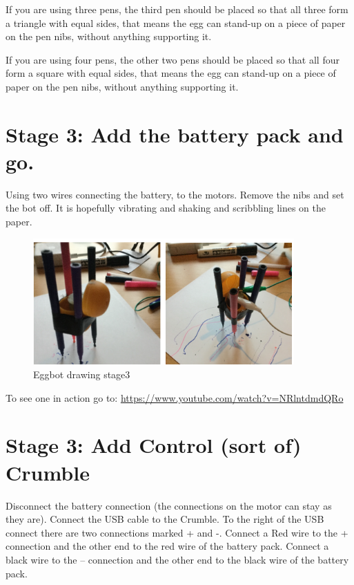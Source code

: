 If you are using three pens, the third pen should be placed so that all three form a triangle with equal sides, that means the egg can stand-up on a piece of paper on the pen nibs, without anything supporting it.
 
If you are using four pens, the other two pens should be placed so that all four form a square with equal sides, that means the egg can stand-up on a piece of paper on the pen nibs, without anything supporting it.

\section{Stage 3: Add the battery pack and go.}

Using two wires connecting the battery, to the motors. Remove the nibs and set the bot off. It is hopefully vibrating and shaking and scribbling lines on the paper.

\begin{figure}
    \centering
    \includegraphics[width=10cm]{chapters/ChapterP1/figures/eggbot_stage3.png}
    \caption{Eggbot drawing stage3}
    \label{fig:Egggbotdrawing3}
\end{figure}


To see one in action go to: 
\url{https://www.youtube.com/watch?v=NRlntdmdQRo}

\section{Stage 3: Add Control (sort of) Crumble}

Disconnect the battery connection (the connections on the motor can stay as they are). Connect the USB cable to the Crumble. To the right of the USB connect there are two connections marked + and -. Connect a Red wire to the + connection and the other end to the red wire of the battery pack. Connect a black wire to the – connection and the other end to the black wire of the battery pack.

